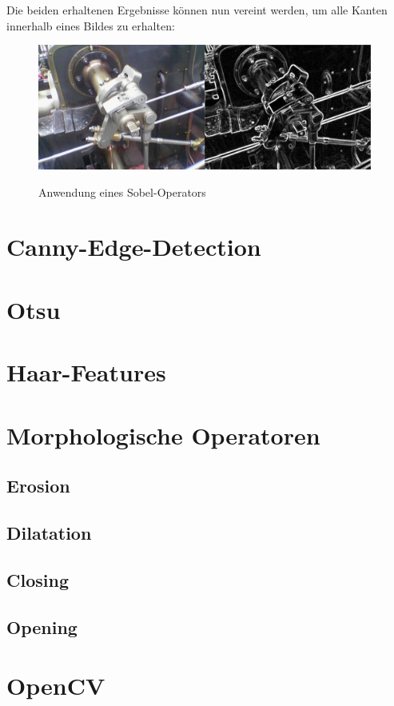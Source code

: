 Die beiden erhaltenen Ergebnisse können nun vereint werden, um alle Kanten innerhalb eines Bildes zu erhalten:

\begin{figure}[ht]
   \centering
     \includegraphics[width=11cm]{Bilder/Sobel} \\
 \caption{Anwendung eines Sobel-Operators}
 \label{fig:Sobel}
\end{figure}

\section{Canny-Edge-Detection} %
\section{Otsu} %
\section{Haar-Features} %

\section{Morphologische Operatoren} %
\subsection{Erosion}
\subsection{Dilatation}
\subsection{Closing}
\subsection{Opening}

\section{OpenCV} %
